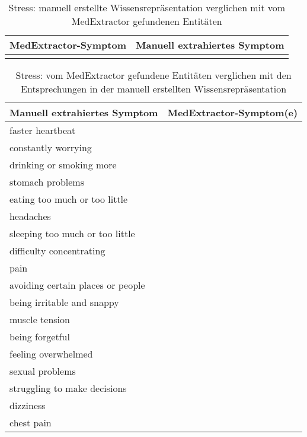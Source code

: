 \begin{table}[H]
\begin{center}
\begin{tabular}{ll}
\toprule
  MedExtractor-Symptom &                       Manuell extrahiertes Symptom \\
\midrule
                &                                                \\
              
\bottomrule
\end{tabular}
\caption{Stress: manuell erstellte Wissensrepräsentation verglichen mit vom MedExtractor gefundenen Entitäten}
\label{tab:stress_vergleich_manuell_medextractor}
\end{center}
\end{table}


\begin{table}[H]
\begin{center}
\begin{tabular}{ll}
\toprule
                      Manuell extrahiertes Symptom &       MedExtractor-Symptom(e) \\
\midrule
                 faster heartbeat &               \\
              constantly worrying &               \\
         drinking or smoking more &               \\
                 stomach problems &               \\
    eating too much or too little &               \\
                        headaches &               \\
  sleeping too much or too little &               \\
         difficulty concentrating &               \\
                             pain &               \\
avoiding certain places or people &               \\
       being irritable and snappy &               \\
                   muscle tension &               \\
                  being forgetful &               \\
              feeling overwhelmed &               \\
                  sexual problems &               \\
     struggling to make decisions &               \\
                        dizziness &               \\
                       chest pain &               \\
\bottomrule
\end{tabular}
\caption{Stress: vom MedExtractor gefundene Entitäten verglichen mit den Entsprechungen in der manuell erstellten Wissensrepräsentation}
\label{tab:stress_medextractor_manuell}
\end{center}
\end{table}



